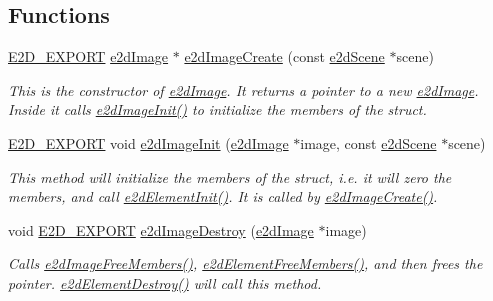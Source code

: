 \subsection*{Functions}
\begin{DoxyCompactItemize}
\item 
\hyperlink{Ez2DS_8h_a9f14e9cb869e1a85fdaba03afcca0df9}{E2\-D\-\_\-\-E\-X\-P\-O\-R\-T} \hyperlink{structe2dImage}{e2d\-Image} $\ast$ \hyperlink{group__e2dImage_gad7713253bd08e8ca835df5bbd1d0e483}{e2d\-Image\-Create} (const \hyperlink{structe2dScene}{e2d\-Scene} $\ast$scene)
\begin{DoxyCompactList}\small\item\em This is the constructor of \hyperlink{structe2dImage}{e2d\-Image}. It returns a pointer to a new \hyperlink{structe2dImage}{e2d\-Image}. Inside it calls \hyperlink{group__e2dImage_ga0a0c74828b747b37bc844851fb28f624}{e2d\-Image\-Init()} to initialize the members of the struct. \end{DoxyCompactList}\item 
\hyperlink{Ez2DS_8h_a9f14e9cb869e1a85fdaba03afcca0df9}{E2\-D\-\_\-\-E\-X\-P\-O\-R\-T} void \hyperlink{group__e2dImage_ga0a0c74828b747b37bc844851fb28f624}{e2d\-Image\-Init} (\hyperlink{structe2dImage}{e2d\-Image} $\ast$image, const \hyperlink{structe2dScene}{e2d\-Scene} $\ast$scene)
\begin{DoxyCompactList}\small\item\em This method will initialize the members of the struct, i.\-e. it will zero the members, and call \hyperlink{group__e2dElement_ga8734d10ef40a380dfc51bfe1790a92a7}{e2d\-Element\-Init()}. It is called by \hyperlink{group__e2dImage_gad7713253bd08e8ca835df5bbd1d0e483}{e2d\-Image\-Create()}. \end{DoxyCompactList}\item 
void \hyperlink{Ez2DS_8h_a9f14e9cb869e1a85fdaba03afcca0df9}{E2\-D\-\_\-\-E\-X\-P\-O\-R\-T} \hyperlink{group__e2dImage_ga0cf5299cb1479f855966613374a7968a}{e2d\-Image\-Destroy} (\hyperlink{structe2dImage}{e2d\-Image} $\ast$image)
\begin{DoxyCompactList}\small\item\em Calls \hyperlink{group__e2dImage_gadc2770640a66380dabbb5c6399f4e7db}{e2d\-Image\-Free\-Members()}, \hyperlink{group__e2dElement_ga5c3a7d29f41609686a3a455bad6ef7c9}{e2d\-Element\-Free\-Members()}, and then frees the pointer. \hyperlink{group__e2dElement_ga2fdc3435e0e1ac9d1e1f0b330d9539fa}{e2d\-Element\-Destroy()} will call this method. \end{DoxyCompactList}\item 

\end{DoxyCompactItemize}
